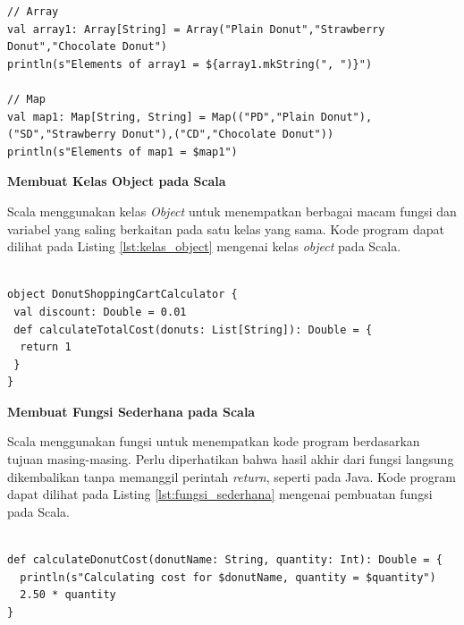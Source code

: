 \documentclass[a4paper,twoside]{article}
\begin{document}
\begin{enumerate}
\begin{lstlisting}[basicstyle=\ttfamily, frame=single,
	columns=fullflexible, keepspaces=true, breaklines=true, label=lst:mutable_collection, caption=Membuat mutable collection pada Scala]
// Array
val array1: Array[String] = Array("Plain Donut","Strawberry Donut","Chocolate Donut")
println(s"Elements of array1 = ${array1.mkString(", ")}")

// Map
val map1: Map[String, String] = Map(("PD","Plain Donut"),("SD","Strawberry Donut"),("CD","Chocolate Donut"))
println(s"Elements of map1 = $map1")
\end{lstlisting}

\newpage
\textbf{Membuat Kelas Object pada Scala}

Scala menggunakan kelas \textit{Object} untuk menempatkan berbagai macam fungsi dan variabel yang saling berkaitan pada satu kelas yang sama. Kode program dapat dilihat pada Listing \ref{lst:kelas_object} mengenai kelas \textit{object} pada Scala.

\begin{lstlisting}[basicstyle=\ttfamily, frame=single,
	columns=fullflexible, keepspaces=true, breaklines=true, label=lst:kelas_object, caption=Membuat Kelas Object pada Scala]

object DonutShoppingCartCalculator {
 val discount: Double = 0.01
 def calculateTotalCost(donuts: List[String]): Double = {
  return 1
 }
}

\end{lstlisting}

\textbf{Membuat Fungsi Sederhana pada Scala}

Scala menggunakan fungsi untuk menempatkan kode program berdasarkan tujuan masing-masing. Perlu diperhatikan bahwa hasil akhir dari fungsi langsung dikembalikan tanpa memanggil perintah \textit{return}, seperti pada Java. Kode program dapat dilihat pada Listing \ref{lst:fungsi_sederhana} mengenai pembuatan fungsi pada Scala.

\begin{lstlisting}[basicstyle=\ttfamily, frame=single,
	columns=fullflexible, keepspaces=true, breaklines=true, label=lst:fungsi_sederhana, caption=Membuat Fungsi Sedehana pada Scala]

def calculateDonutCost(donutName: String, quantity: Int): Double = {
  println(s"Calculating cost for $donutName, quantity = $quantity")
  2.50 * quantity
}

\end{lstlisting}



\end{enumerate}
\end{document}
